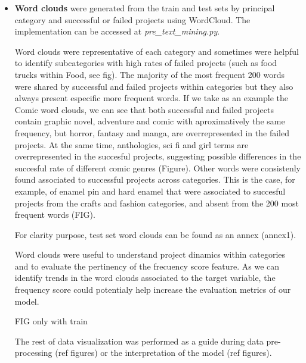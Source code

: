 \documentclass{article}
\begin{document}
{\begin{itemize}
Pandas profiling generates an statistical description of the data and each variable, computes interaction and correlation plots and warns about potential sources of problems such as high correlation, duplicates, high cardinality for categorical variables and skewed or zero containing variables.
These reports were extremely useful to quickly identify duplicated rows, variables with high numbers of missing values and also non numerical variables present in the train and test sets that are incompatible with XGBoost modeling.

\item \textbf{Word clouds} were generated from the train and test sets by principal category and successful or failed projects using WordCloud. 
The implementation can be accessed at \emph{pre\_text\_mining.py}.

Word clouds were representative of each category and sometimes were helpful to identify subcategories with high rates of failed projects (such as food trucks within Food, see fig). The majority of the most frequent 200 words were shared by successful and failed projects within categories but they also always present especific more frequent words.
If we take as an example the Comic word clouds, we can see that both successful and failed projects contain graphic novel, adventure and comic with aproximatively the same frequency, but horror, fantasy and manga, are overrepresented in the failed projects. At the same time, anthologies, sci fi and girl terms are overrepresented in the succesful projects, suggesting possible differences in the succesful rate of different comic genres (Figure).
Other words were consistenly found associated to successful projects across categories. This is the case, for example, of enamel pin and hard enamel that were associated to succesful projects from the crafts and fashion categories, and absent from the 200 most frequent words (FIG).

For clarity purpose, test set word clouds can be found as an annex (annex1).

Word clouds were useful to understand project dinamics within categories and to evaluate the pertinency of the frecuency score feature. As we can identify trends in the word clouds associated to the target variable, the frequency score could potentialy help increase the evaluation metrics of our model.

FIG only with train

The rest of data visualization was performed as a guide during data pre-processing (ref figures) or the interpretation of the model (ref figures).


\end{itemize}}
\end{document}

